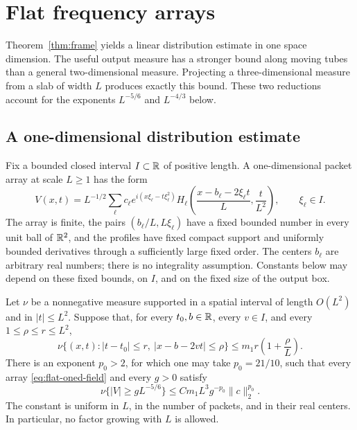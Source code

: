 \section{Flat frequency arrays}\label{sec:flat}

Theorem~\ref{thm:frame} yields a linear distribution estimate in one
space dimension.  The useful output measure has a stronger bound along
moving tubes than a general two-dimensional measure.  Projecting a
three-dimensional measure from a slab of width $L$ produces exactly this
bound.  These two reductions account for the exponents $L^{-5/6}$ and
$L^{-4/3}$ below.

\subsection{A one-dimensional distribution estimate}

Fix a bounded closed interval $I\subset\mathbb R$ of positive length.  A
one-dimensional packet array at scale $L\geq1$ has the form
\begin{equation}\label{eq:flat-oned-field}
 V(x,t)=L^{-1/2}\sum_{\ell}c_\ell
 e^{i(x\xi_\ell-t\xi_\ell^2)}
 H_\ell\left(\frac{x-b_\ell-2\xi_\ell t}{L},
                  \frac{t}{L^2}\right),\qquad \xi_\ell\in I.
\end{equation}
The array is finite, the pairs $(b_\ell/L,L\xi_\ell)$ have a fixed
bounded number in every unit ball of $\mathbb R^2$, and the profiles have fixed
compact support and uniformly bounded derivatives through a sufficiently
large fixed order.  The centers $b_\ell$ are arbitrary real numbers;
there is no integrality assumption.  Constants below may depend on these
fixed bounds, on $I$, and on the fixed size of the output box.

\begin{proposition}\label{prop:oned}
Let $\nu$ be a nonnegative measure supported in a spatial interval of
length $O(L^2)$ and in $|t|\leq L^2$.  Suppose that, for every
$t_0,b\in\mathbb R$, every $v\in I$, and every $1\leq\rho\leq r\leq L^2$,
\begin{equation}\label{eq:flat-tube-test}
 \nu\bigl\{(x,t): |t-t_0|\leq r,
                 \ |x-b-2vt|\leq\rho\bigr\}
       \leq m_1 r\left(1+\frac{\rho}{L}\right).
\end{equation}
There is an exponent $p_0>2$, for which one may take $p_0=21/10$, such
that every array \eqref{eq:flat-oned-field} and every $g>0$ satisfy
\begin{equation}\label{eq:src9}
 \nu\{|V|\geq gL^{-5/6}\}
       \leq C m_1 L^3 g^{-p_0}\|c\|_2^{p_0}.
\end{equation}
The constant is uniform in $L$, in the number of packets, and in their
real centers.  In particular, no factor growing with $L$ is allowed.
\end{proposition}

